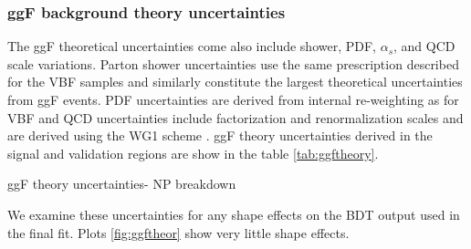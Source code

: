 \subsubsection{ggF background theory uncertainties}
The ggF theoretical uncertainties come also include shower, PDF, $\alpha_s$, and QCD scale variations. Parton shower uncertainties use the same prescription described for the VBF samples and similarly constitute the largest theoretical uncertainties from ggF events. PDF uncertainties are derived from internal re-weighting as for VBF and QCD uncertainties include factorization and renormalization scales and are derived using the WG1 scheme \cite{WG1}. ggF theory uncertainties derived in the signal and validation regions are show in the table \ref{tab:ggftheory}.
\begin{table}[h!]
\scalebox{0.6}{

}
\caption{ggF theory uncertainties- NP breakdown}
\label{tab:ggftheory}
\end{table}

We examine these uncertainties for any shape effects on the BDT output used in the final fit. Plots \ref{fig:ggftheor} show very little shape effects. 

